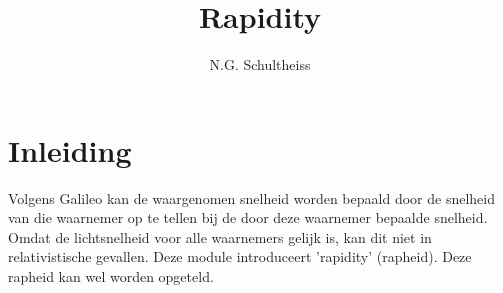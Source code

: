 
\usepackage{tikz}
\usepackage{multicol}
\usetikzlibrary{shapes}
\usetikzlibrary{plotmarks}



\title{Rapidity}


\author{N.G. Schultheiss}

\maketitle

\section{Inleiding}

Volgens Galileo kan de waargenomen snelheid worden bepaald door de snelheid van die waarnemer op te tellen bij de door deze waarnemer bepaalde snelheid. Omdat de lichtsnelheid voor alle waarnemers gelijk is, kan dit niet in relativistische gevallen. Deze module introduceert 'rapidity' (rapheid). Deze rapheid kan wel worden opgeteld.

